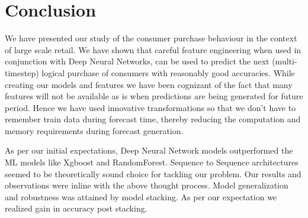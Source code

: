 \section{Conclusion}
\label{sec:conclusion}
We have presented our study of the consumer purchase behaviour in the context of large scale retail. 
We have shown that careful feature
engineering when used in conjunction with Deep Neural Networks, can be used
to predict the next (multi-timestep) logical purchase of consumers with reasonably good accuracies.
While creating our models and features we have been cognizant of
the fact that many features will not be available as is when predictions
are being generated for future period. Hence we have used innovative transformations so that we don’t have to remember train
data during forecast time, thereby reducing the computation and memory requirements during forecast generation.

As per our initial expectations, Deep Neural Network models outperformed the ML models like Xgboost and RandomForest.
Sequence to Sequence architectures seemed to be theoretically sound choice for tackling our problem. Our results and 
observations were inline with the above thought process. Model generalization and robustness
was attained by model stacking. As per our expectation we realized gain in accuracy post stacking.

 

